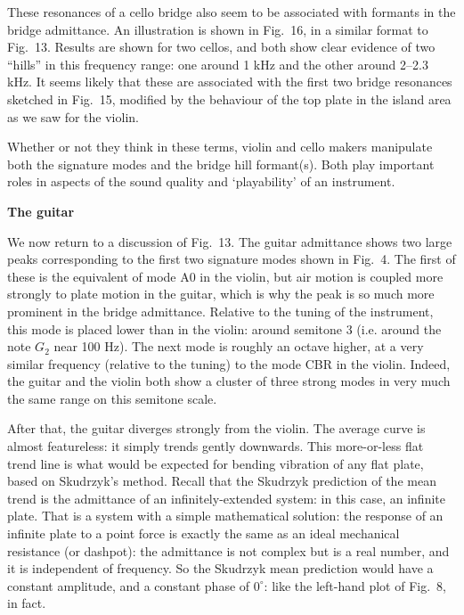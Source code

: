 
  These resonances of a cello bridge also seem to be associated with formants 
  in the bridge admittance. An illustration is shown in Fig.\ 16, in a similar 
  format to Fig.\ 13. Results are shown for two cellos, and both show clear 
  evidence of two ``hills'' in this frequency range: one around 1 kHz and the 
  other around 2--2.3 kHz. It seems likely that these are associated with the 
  first two bridge resonances sketched in Fig.\ 15, modified by the behaviour 
  of the top plate in the island area as we saw for the violin. 


  Whether or not they think in these terms, violin and cello makers manipulate 
  both the signature modes and the bridge hill formant(s). Both play important 
  roles in aspects of the sound quality and `playability' of an instrument. 

  \textbf{The guitar} 

  We now return to a discussion of Fig.\ 13. The guitar admittance shows two 
  large peaks corresponding to the first two signature modes shown in Fig.\ 4. 
  The first of these is the equivalent of mode A0 in the violin, but air motion 
  is coupled more strongly to plate motion in the guitar, which is why the peak 
  is so much more prominent in the bridge admittance. Relative to the tuning of 
  the instrument, this mode is placed lower than in the violin: around semitone 
  3 (i.e. around the note $G_2$ near 100 Hz). The next mode is roughly an 
  octave higher, at a very similar frequency (relative to the tuning) to the 
  mode CBR in the violin. Indeed, the guitar and the violin both show a cluster 
  of three strong modes in very much the same range on this semitone scale. 

  After that, the guitar diverges strongly from the violin. The average curve 
  is almost featureless: it simply trends gently downwards. This more-or-less 
  flat trend line is what would be expected for bending vibration of any flat 
  plate, based on Skudrzyk's method. Recall that the Skudrzyk prediction of the 
  mean trend is the admittance of an infinitely-extended system: in this case, 
  an infinite plate. That is a system with a simple mathematical solution: the 
  response of an infinite plate to a point force is exactly the same as an 
  ideal mechanical resistance (or dashpot): the admittance is not complex but 
  is a real number, and it is independent of frequency. So the Skudrzyk mean 
  prediction would have a constant amplitude, and a constant phase of 
  $0^\circ$: like the left-hand plot of Fig.\ 8, in fact. 

